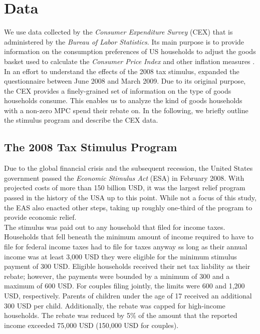 \section{Data} \label{sec:data}
We use data collected by the \textit{Consumer Expenditure Survey} (CEX) that is administered by the \textit{Bureau of Labor Statistics}. Its main purpose is to provide information on the consumption preferences of US households to adjust the goods basket used to calculate the \textit{Consumer Price Index} and other inflation measures \citep{CEX}. In an effort to understand the effects of the 2008 tax stimulus, \cite{parkeretal_2013} expanded the questionnaire between June 2008 and March 2009.  Due to its original purpose, the CEX provides a finely-grained set of information on the type of goods households consume. This enables us to analyze the kind of goods households with a non-zero MPC spend their rebate on. In the following, we briefly outline the stimulus program and describe the CEX data. 

\subsection{The 2008 Tax Stimulus Program}  \label{subsec:stimulus_desc}
Due to the global financial crisis and the subsequent recession, the United States government passed the \textit{Economic Stimulus Act} (ESA) in February 2008. With projected costs of more than 150 billion USD, it was the largest relief program passed in the history of the USA up to this point. While not a focus of this study, the EAS also enacted other steps, taking up roughly one-third of the program to provide economic relief. \\
The stimulus was paid out to any household that filed for income taxes. Households that fell beneath the minimum amount of income required to have to file for federal income taxes had to file for taxes anyway ss long as their annual income was at least 3,000 USD they were eligible for the minimum stimulus payment of 300 USD. Eligible households received their net tax liability as their rebate; however, the payments were bounded by a minimum of 300 and a maximum of 600 USD. For couples filing jointly, the limits were 600 and 1,200 USD, respectively. Parents of children under the age of 17 received an additional 300 USD per child. Additionally, the rebate was capped for high-income households. The rebate was reduced by 5\% of the amount that the reported income exceeded 75,000 USD (150,000 USD for couples).

